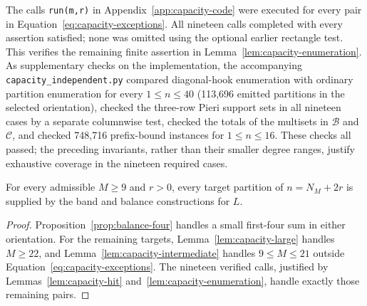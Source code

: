 The calls \texttt{run(m,r)} in Appendix~\ref{app:capacity-code}
were executed for every pair in
Equation~\eqref{eq:capacity-exceptions}. All nineteen calls
completed with every assertion satisfied; none was omitted using
the optional earlier rectangle test. This verifies the remaining
finite assertion in Lemma~\ref{lem:capacity-enumeration}.
As supplementary checks on the implementation, the accompanying
\texttt{capacity\_independent.py} compared diagonal-hook enumeration
with ordinary partition enumeration for every $1\le n\le40$
(113,696 emitted partitions in the selected orientation), checked
the three-row Pieri support sets in all nineteen cases by a separate
columnwise test, checked the totals of the multisets in $\mathcal B$
and $\mathcal C$, and checked 748,716 prefix-bound instances for
$1\le n\le16$.
These checks all passed; the preceding invariants, rather than
their smaller degree ranges, justify exhaustive coverage in the
nineteen required cases.

\begin{proposition}
\label{prop:capacity-exhaustion}
For every admissible $M\ge9$ and $r>0$, every target partition of
$n=N_M+2r$ is supplied by the band and balance constructions for
$L$.
\end{proposition}

\begin{proof}
Proposition~\ref{prop:balance-four} handles a small first-four sum in
either orientation. For the remaining targets,
Lemma~\ref{lem:capacity-large} handles $M\ge22$, and
Lemma~\ref{lem:capacity-intermediate} handles $9\le M\le21$
outside Equation~\eqref{eq:capacity-exceptions}.
The nineteen verified calls, justified by
Lemmas~\ref{lem:capacity-hit} and~\ref{lem:capacity-enumeration},
handle exactly those remaining pairs.
\end{proof}
